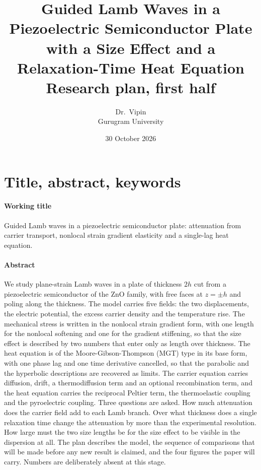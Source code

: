 \documentclass[11pt]{article}
\title{\vspace{-1.6cm}\Large Guided Lamb Waves in a Piezoelectric Semiconductor Plate with a Size Effect and a\\[2pt]
Relaxation-Time Heat Equation\\[8pt]\large Research plan, first half}
\author{Dr.\ Vipin \\ Gurugram University}
\date{30 October 2026}
\begin{document}
\maketitle
\vspace{-6mm}

\section{Title, abstract, keywords}

\paragraph{Working title} Guided Lamb waves in a piezoelectric semiconductor plate: attenuation from carrier
transport, nonlocal strain gradient elasticity and a single-lag heat equation.

\paragraph{Abstract} We study plane-strain Lamb waves in a plate of thickness $2h$ cut from a piezoelectric
semiconductor of the ZnO family, with free faces at $z=\pm h$ and poling along the thickness. The model
carries five fields: the two displacements, the electric potential, the excess carrier density and the
temperature rise. The mechanical stress is written in the nonlocal strain gradient form, with one length
for the nonlocal softening and one for the gradient stiffening, so that the size effect is described by
two numbers that enter only as length over thickness. The heat equation is of the Moore-Gibson-Thompson (MGT)
type in its base form, with one phase lag and one time derivative cancelled, so that the
parabolic and the hyperbolic descriptions are recovered as limits. The carrier equation carries
diffusion, drift, a thermodiffusion term and an optional recombination term, and the heat equation carries
the reciprocal Peltier term, the thermoelastic coupling and the pyroelectric coupling. Three questions are
asked. How much attenuation does the carrier field add to each Lamb branch. Over what thickness does a
single relaxation time change the attenuation by more than the experimental resolution. How large must the
two size lengths be for the size effect to be visible in the dispersion at all. The plan describes the
model, the sequence of comparisons that will be made before any new result is claimed, and the four
figures the paper will carry. Numbers are deliberately absent at this stage.
\end{document}
